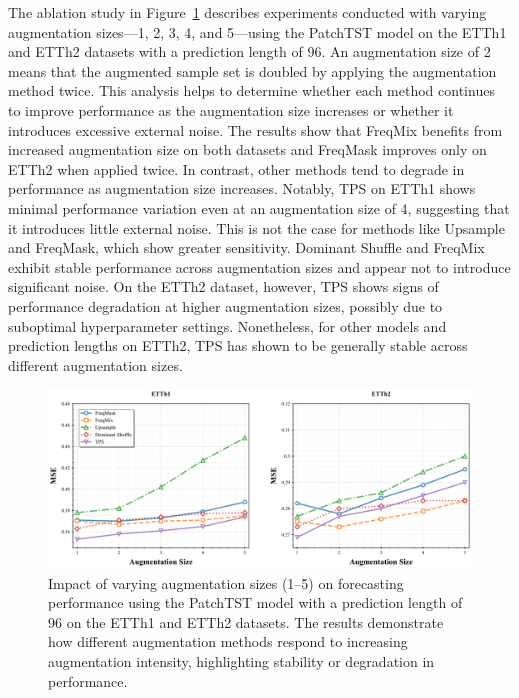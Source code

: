 The ablation study in Figure~\ref{fig:augsizetsf} describes experiments conducted with varying augmentation sizes—1, 2, 3, 4, and 5—using the PatchTST model on the ETTh1 and ETTh2 datasets with a prediction length of 96. An augmentation size of 2 means that the augmented sample set is doubled by applying the augmentation method twice. This analysis helps to determine whether each method continues to improve performance as the augmentation size increases or whether it introduces excessive external noise.
The results show that FreqMix benefits from increased augmentation size on both datasets and FreqMask improves only on ETTh2 when applied twice. In contrast, other methods tend to degrade in performance as augmentation size increases. Notably, TPS on ETTh1 shows minimal performance variation even at an augmentation size of 4, suggesting that it introduces little external noise. This is not the case for methods like Upsample and FreqMask, which show greater sensitivity.
Dominant Shuffle and FreqMix exhibit stable performance across augmentation sizes and appear not to introduce significant noise. On the ETTh2 dataset, however, TPS shows signs of performance degradation at higher augmentation sizes, possibly due to suboptimal hyperparameter settings. Nonetheless, for other models and prediction lengths on ETTh2, TPS has shown to be generally stable across different augmentation sizes.


\begin{figure}[h!]
    \centering
\includegraphics[page=1, width=1.0\textwidth, keepaspectratio]{./images/augmentation_size_analysis.pdf}
\caption{Impact of varying augmentation sizes (1–5) on forecasting performance using the PatchTST model with a prediction length of 96 on the ETTh1 and ETTh2 datasets. The results demonstrate how different augmentation methods respond to increasing augmentation intensity, highlighting stability or degradation in performance.}
    \label{fig:augsizetsf}
\end{figure}





